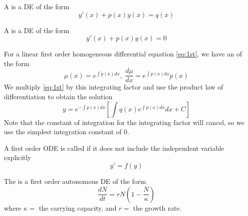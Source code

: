\documentclass[12pt, a4paper, oneside, openright, titlepage]{book}
\begin{document}


\begin{defn}
        A  is a DE of the form \begin{equation}
                y'(x) + p(x)y(x) = q(x) \label{eq:1st}
        \end{equation}
\end{defn}




\begin{defn}
        A  is a DE of the form \begin{equation}
                y'(x) + p(x)y(x) = 0
        \end{equation}
\end{defn}





\begin{defn}
        For a linear first order homogeneous differential equation \ref{eq:1st}, we have an  of the form \begin{equation}
                \mu(x) = e^{\int p(x)dx},\;\frac{d\mu}{dx} = e^{\int p(x)dx}p(x)
        \end{equation}
        We multiply \ref{eq:1st} by this integrating factor and use the product law of differentiation to obtain the solution
        \begin{equation}
                y = e^{-\int p(x) dx}\left[\int q(x)e^{\int p(x)dx}dx + C \right]
        \end{equation}
        Note that the constant of integration for the integrating factor will cancel, so we use the simplest integration constant of 0.
\end{defn}





\begin{defn}[Autonomous]
        A first order ODE is called  if it does not include the independent variable explicitly \begin{equation}
                y' = f(y)
        \end{equation}
\end{defn}




\begin{eg}
        The  is a first order autonomous DE of the form \begin{equation}
                \frac{dN}{dt} = rN\left(1 - \frac{N}{\kappa}\right)
        \end{equation}
        where $\kappa = $ the carrying capacity, and $r = $ the growth rate.
\end{eg}
\end{document}
